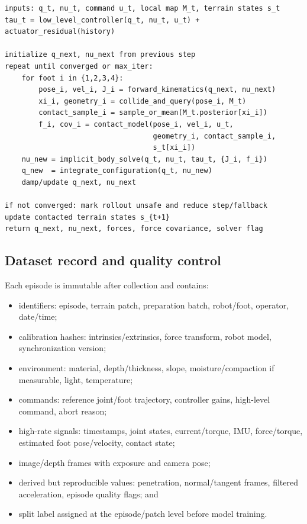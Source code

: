 \begin{verbatim}
inputs: q_t, nu_t, command u_t, local map M_t, terrain states s_t
tau_t = low_level_controller(q_t, nu_t, u_t) + actuator_residual(history)

initialize q_next, nu_next from previous step
repeat until converged or max_iter:
    for foot i in {1,2,3,4}:
        pose_i, vel_i, J_i = forward_kinematics(q_next, nu_next)
        xi_i, geometry_i = collide_and_query(pose_i, M_t)
        contact_sample_i = sample_or_mean(M_t.posterior[xi_i])
        f_i, cov_i = contact_model(pose_i, vel_i, u_t,
                                   geometry_i, contact_sample_i,
                                   s_t[xi_i])
    nu_new = implicit_body_solve(q_t, nu_t, tau_t, {J_i, f_i})
    q_new  = integrate_configuration(q_t, nu_new)
    damp/update q_next, nu_next

if not converged: mark rollout unsafe and reduce step/fallback
update contacted terrain states s_{t+1}
return q_next, nu_next, forces, force covariance, solver flag
\end{verbatim}

\subsection{Dataset record and quality control}

Each episode is immutable after collection and contains:
\begin{itemize}
  \item identifiers: episode, terrain patch, preparation batch, robot/foot, operator, date/time;
  \item calibration hashes: intrinsics/extrinsics, force transform, robot model, synchronization version;
  \item environment: material, depth/thickness, slope, moisture/compaction if measurable, light, temperature;
  \item commands: reference joint/foot trajectory, controller gains, high-level command, abort reason;
  \item high-rate signals: timestamps, joint states, current/torque, IMU, force/torque, estimated foot pose/velocity, contact state;
  \item image/depth frames with exposure and camera pose;
  \item derived but reproducible values: penetration, normal/tangent frames, filtered acceleration, episode quality flags; and
  \item split label assigned at the episode/patch level before model training.
\end{itemize}

